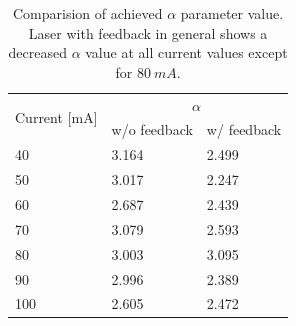 \begin{table}[!htb]
    \centering
    \caption{Comparision of achieved $\alpha$ parameter value. Laser with feedback in general shows a decreased $\alpha$ value at all current values except for $80 \ mA$.}
    \label{tab:chirp_alpha_comparison}
    \begin{tabular}{@{}lll@{}}
    \toprule
    \multirow{2}{*}{Current {[}mA{]}} & \multicolumn{2}{c}{$\alpha$} \\ \cmidrule(l){2-3} 
                                      & w/o feedback  & w/ feedback  \\ \midrule
    40                                & 3.164         & 2.499        \\
    50                                & 3.017         & 2.247        \\
    60                                & 2.687         & 2.439        \\
    70                                & 3.079         & 2.593        \\
    80                                & 3.003         & 3.095        \\
    90                                & 2.996         & 2.389        \\
    100                               & 2.605         & 2.472        \\ \bottomrule
    \end{tabular}
\end{table}

